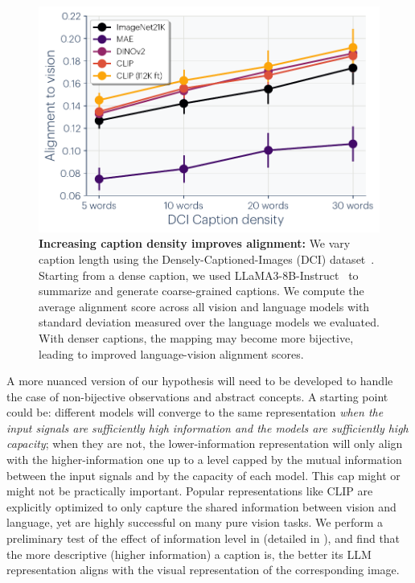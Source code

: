 \documentclass{article}
\theoremstyle{plain}
\theoremstyle{definition}
\theoremstyle{remark}
\begin{document}
\begin{figure}[t!]
    \centering
    \includegraphics[width=\linewidth]{figures/caption_density_dci_combined.pdf}%
    \vspace{-11pt}%
    \caption{\small \textbf{Increasing caption density improves alignment:} We vary caption length using the Densely-Captioned-Images (DCI) dataset~\cite{urbanek2023picture}. Starting from a dense caption, we used LLaMA3-8B-Instruct~\cite{meta2024llama3} to summarize and generate coarse-grained captions. We compute the average alignment score across all vision and language models with standard deviation measured over the language models we evaluated. With denser captions, the mapping may become more bijective, leading to improved language-vision alignment scores.}
    \label{fig:caption_density}
\end{figure}


A more nuanced version of our hypothesis will need to be developed to handle the case of non-bijective observations and abstract concepts. A starting point could be: different models will converge to the same representation \textit{when the input signals are sufficiently high information and the models are sufficiently high capacity}; when they are not, the lower-information representation will only align with the higher-information one up to a level capped by the mutual information between the input signals and by the capacity of each model. This cap might or might not be practically important. Popular representations like CLIP are explicitly optimized to only capture the shared information between vision and language, yet are highly successful on many pure vision tasks. 
We perform a preliminary test of the effect of information level in  (detailed in ), and find that the more descriptive (higher information) a caption is, the better its LLM representation aligns with the visual representation of the corresponding image.
\end{document}
